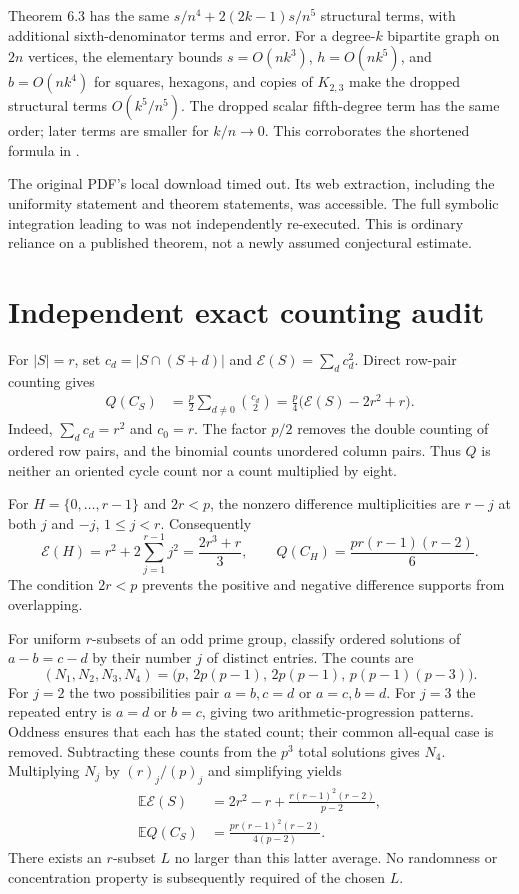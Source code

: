 \documentclass[11pt,a4paper]{article}
\newcommand{\E}{\mathbb E}
\begin{document}
Theorem 6.3 has the same $s/n^4+2(2k-1)s/n^5$ structural terms, with additional sixth-denominator terms and error. For a degree-$k$ bipartite graph on $2n$ vertices, the elementary bounds $s=O(nk^3)$, $h=O(nk^5)$, and $b=O(nk^4)$ for squares, hexagons, and copies of $K_{2,3}$ make the dropped structural terms $O(k^5/n^5)$. The dropped scalar fifth-degree term has the same order; later terms are smaller for $k/n\to0$. This corroborates the shortened formula in \cite{audit:CW}.

The original PDF's local download timed out. Its web extraction, including the uniformity statement and theorem statements, was accessible. The full symbolic integration leading to \cite[Theorem 6.2]{audit:GM} was not independently re-executed. This is ordinary reliance on a published theorem, not a newly assumed conjectural estimate.

\section{Independent exact counting audit}
For $|S|=r$, set $c_d=|S\cap(S+d)|$ and $\mathcal E(S)=\sum_dc_d^2$. Direct row-pair counting gives
\begin{align}
 Q(C_S)&=\frac p2\sum_{d\ne0}\binom{c_d}{2}
       =\frac p4\bigl(\mathcal E(S)-2r^2+r\bigr).\label{audit:Q}
\end{align}
Indeed, $\sum_dc_d=r^2$ and $c_0=r$. The factor $p/2$ removes the double counting of ordered row pairs, and the binomial counts unordered column pairs. Thus $Q$ is neither an oriented cycle count nor a count multiplied by eight.

For $H=\{0,\ldots,r-1\}$ and $2r<p$, the nonzero difference multiplicities are $r-j$ at both $j$ and $-j$, $1\le j<r$. Consequently
\[
 \mathcal E(H)=r^2+2\sum_{j=1}^{r-1}j^2=\frac{2r^3+r}{3},
 \qquad Q(C_H)=\frac{pr(r-1)(r-2)}6.
\]
The condition $2r<p$ prevents the positive and negative difference supports from overlapping.

For uniform $r$-subsets of an odd prime group, classify ordered solutions of $a-b=c-d$ by their number $j$ of distinct entries. The counts are
\[
 (N_1,N_2,N_3,N_4)
 =\bigl(p,\,2p(p-1),\,2p(p-1),\,p(p-1)(p-3)\bigr).
\]
For $j=2$ the two possibilities pair $a=b,c=d$ or $a=c,b=d$. For $j=3$ the repeated entry is $a=d$ or $b=c$, giving two arithmetic-progression patterns. Oddness ensures that each has the stated count; their common all-equal case is removed. Subtracting these counts from the $p^3$ total solutions gives $N_4$. Multiplying $N_j$ by $(r)_j/(p)_j$ and simplifying yields
\begin{align}
 \E\mathcal E(S)&=2r^2-r+\frac{r(r-1)^2(r-2)}{p-2},\\
 \E Q(C_S)&=\frac{pr(r-1)^2(r-2)}{4(p-2)}.\label{audit:average}
\end{align}
There exists an $r$-subset $L$ no larger than this latter average. No randomness or concentration property is subsequently required of the chosen $L$.
\end{document}
